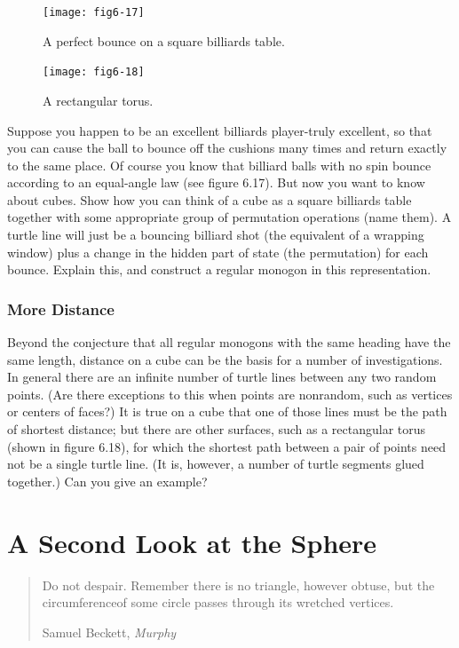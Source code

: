 \documentclass{book}
\begin{document}
\begin{figure}
\begin{center}
\texttt{[image: fig6-17]}
\caption{A perfect bounce on a square billiards table.}
\end{center}
\end{figure}

\begin{figure}
\begin{center}
\texttt{[image: fig6-18]}
\caption{A rectangular torus.}
\end{center}
\end{figure}

Suppose you happen to be an excellent billiards player-truly excellent,
so that you can cause the ball to bounce off the cushions many times and
return exactly to the same place. Of course you know that billiard balls
with no spin bounce according to an equal-angle law (see figure 6.17).
But now you want to know about cubes. Show how you can think of a
cube as a square billiards table together with some appropriate group of
permutation operations (name them). A turtle line will just be a bouncing billiard shot (the equivalent of a wrapping window) plus a change
in the hidden part of state (the permutation) for each bounce. Explain
this, and construct a regular monogon in this representation.

\subsection{More Distance}

Beyond the conjecture that all regular monogons with the same heading
have the same length, distance on a cube can be the basis for a number
of investigations. In general there are an infinite number of turtle lines
between any two random points. (Are there exceptions to this when
points are nonrandom, such as vertices or centers of faces?) It is true
on a cube that one of those lines must be the path of shortest distance;
but there are other surfaces, such as a rectangular torus (shown in figure
6.18), for which the shortest path between a pair of points need not be
a single turtle line. (It is, however, a number of turtle segments glued
together.) Can you give an example?

\chapter{A Second Look at the Sphere}
\begin{quote}
Do not despair. Remember there is no triangle,
however obtuse, but the circumferenceof some circle
passes through its wretched vertices.

Samuel Beckett, {\em Murphy}
\end{quote}
\end{document}
